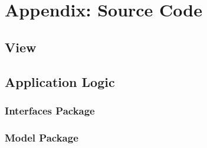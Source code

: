 \chapter{Appendix: Source Code}

\section{View}





\section{Application Logic}

\subsection{Interfaces Package}











\subsection{Model Package}









